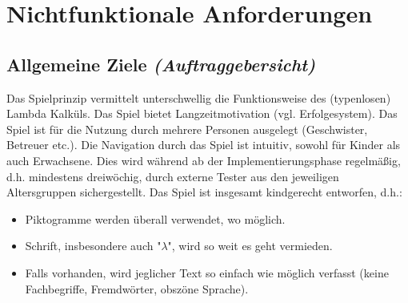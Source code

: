 \section{Nichtfunktionale Anforderungen}

\subsection{Allgemeine Ziele \textit{(Auftraggebersicht)}}
\begin{requirements}
	 Das Spielprinzip vermittelt unterschwellig die Funktionsweise des (typenlosen) Lambda Kalküls.
	 Das Spiel bietet Langzeitmotivation (vgl. Erfolgesystem).
	 Das Spiel ist für die Nutzung durch mehrere Personen ausgelegt (Geschwister, Betreuer etc.).
	 Die Navigation durch das Spiel ist intuitiv, sowohl für Kinder als auch Erwachsene. Dies wird während ab der Implementierungsphase regelmäßig, d.h. mindestens dreiwöchig, durch externe Tester aus den jeweiligen Altersgruppen sichergestellt.
	 Das Spiel ist insgesamt kindgerecht entworfen, d.h.:
		\begin{itemize}
			\item Piktogramme werden überall verwendet, wo möglich.
			\item Schrift, insbesondere auch "$\lambda$", wird so weit es geht vermieden.
			\item Falls vorhanden, wird jeglicher Text so einfach wie möglich verfasst (keine Fachbegriffe, Fremdwörter, obszöne Sprache).
		\end{itemize}
\end{requirements}


